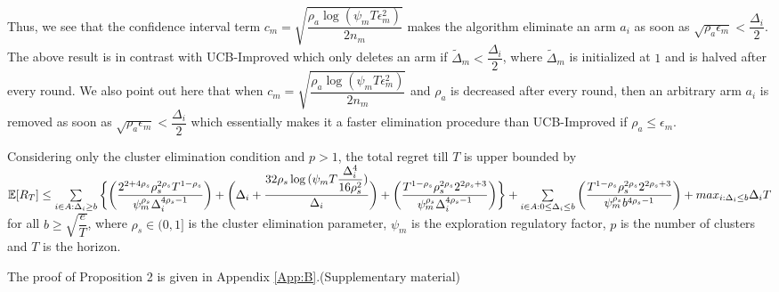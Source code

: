 \paragraph*{} Thus, we see that the confidence interval term $c_{m}=\sqrt{\dfrac{\rho_{a}\log (\psi_{m}T\epsilon_{m}^{2})}{2 n_{m}}}$ makes the algorithm eliminate an arm $a_{i}$ as soon as $\sqrt{\rho_{a}\epsilon_{m}}<\dfrac{\Delta_{i}}{2}$. The above result is in contrast with UCB-Improved which only deletes an arm if $\tilde{\Delta}_{m}<\dfrac{\Delta_{i}}{2}$, where $\tilde{\Delta}_{m}$ is initialized at $1$ and is halved after every round. We also point out here that when $c_{m}=\sqrt{\dfrac{\rho_{a}\log (\psi_{m}T\epsilon_{m}^{2})}{2 n_{m}}}$ and $\rho_{a}$ is decreased after every round, then an arbitrary arm $a_{i}$ is removed as soon as  $\sqrt{\rho_{a}\epsilon_{m}}<\dfrac{\Delta_{i}}{2}$ which essentially makes it a faster elimination procedure than UCB-Improved if $\rho_{a}\leq \epsilon_{m}$.


\begin{proposition}
\label{proofSketch:Prop:2}
Considering only the cluster elimination condition and $p>1$, the total regret till $T$ is upper bounded by $\mathbb{E} [R_{T}]\leq \sum\limits_{i\in A:\Delta_{i}\geq b}\bigg\lbrace \bigg(\dfrac{2^{2+4\rho_{s}}\rho_{s}^{2\rho_{s}}T^{1-\rho_{s}}}{\psi_{m}^{\rho_{s}}\Delta_{i}^{4\rho_{s}-1}}\bigg) + \bigg(\Delta_{i}+\dfrac{32\rho_{s}\log{(\psi_{m}T\dfrac{\Delta_{i}^{4}}{16\rho_{s}^{2}})}}{\Delta_{i}}\bigg)  +  \bigg(\dfrac{T^{1-\rho_{s}}\rho_{s}^{2\rho_{s}}2^{2\rho_{s}+3}}{\psi_{m}^{\rho_{s}}\Delta_{i}^{4\rho_{s} -1}} \bigg)\bigg \rbrace +\sum\limits_{i\in A:0\leq\Delta_{i}\leq b}\bigg(\dfrac{T^{1-\rho_{s}}\rho_{s}^{2\rho_{s}}2^{2\rho_{s}+3}}{\psi_{m}^{\rho_{s}}b^{4\rho_{s} -1}} \bigg) + max_{i:\Delta_{i}\leq b}\Delta_{i}T$ for all $b\geq \sqrt{\dfrac{e}{T}}$, where $\rho_{s}\in (0,1]$ is the cluster elimination parameter, $\psi_{m}$ is the exploration regulatory factor, $p$ is the number of clusters and $T$ is the horizon.
\end{proposition}

	The proof of Proposition 2 is given in Appendix \ref{App:B}.(Supplementary material)
